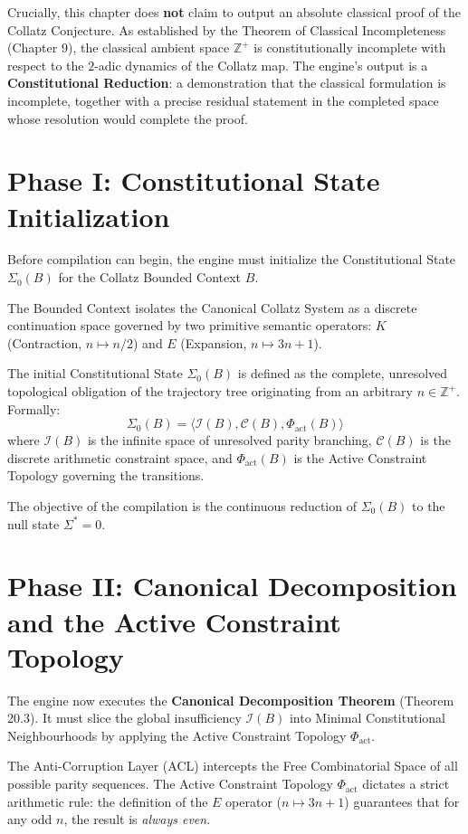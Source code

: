 \documentclass[12pt,openany]{extbook}
\theoremstyle{plain}
\theoremstyle{definition}
\begin{document}
Crucially, this chapter does \textbf{not} claim to output an absolute classical proof of the Collatz Conjecture. As established by the Theorem of Classical Incompleteness (Chapter 9), the classical ambient space $\mathbb{Z}^+$ is constitutionally incomplete with respect to the $2$-adic dynamics of the Collatz map. The engine's output is a \textbf{Constitutional Reduction}: a demonstration that the classical formulation is incomplete, together with a precise residual statement in the completed space whose resolution would complete the proof.

\section{Phase I: Constitutional State Initialization}

Before compilation can begin, the engine must initialize the Constitutional State $\Sigma_0(B)$ for the Collatz Bounded Context $B$.

The Bounded Context isolates the Canonical Collatz System as a discrete continuation space governed by two primitive semantic operators: $K$ (Contraction, $n \mapsto n/2$) and $E$ (Expansion, $n \mapsto 3n+1$).

The initial Constitutional State $\Sigma_0(B)$ is defined as the complete, unresolved topological obligation of the trajectory tree originating from an arbitrary $n \in \mathbb{Z}^+$. Formally:
\[
\Sigma_0(B) = \langle \mathcal{I}(B), \mathcal{C}(B), \Phi_{\mathrm{act}}(B) \rangle
\]
where $\mathcal{I}(B)$ is the infinite space of unresolved parity branching, $\mathcal{C}(B)$ is the discrete arithmetic constraint space, and $\Phi_{\mathrm{act}}(B)$ is the Active Constraint Topology governing the transitions.

The objective of the compilation is the continuous reduction of $\Sigma_0(B)$ to the null state $\Sigma^* = 0$.

\section{Phase II: Canonical Decomposition and the Active Constraint Topology}

The engine now executes the \textbf{Canonical Decomposition Theorem} (Theorem 20.3). It must slice the global insufficiency $\mathcal{I}(B)$ into Minimal Constitutional Neighbourhoods by applying the Active Constraint Topology $\Phi_{\mathrm{act}}$.

The Anti-Corruption Layer (ACL) intercepts the Free Combinatorial Space of all possible parity sequences. The Active Constraint Topology $\Phi_{\mathrm{act}}$ dictates a strict arithmetic rule: the definition of the $E$ operator ($n \mapsto 3n+1$) guarantees that for any odd $n$, the result is \emph{always even}.
\end{document}
